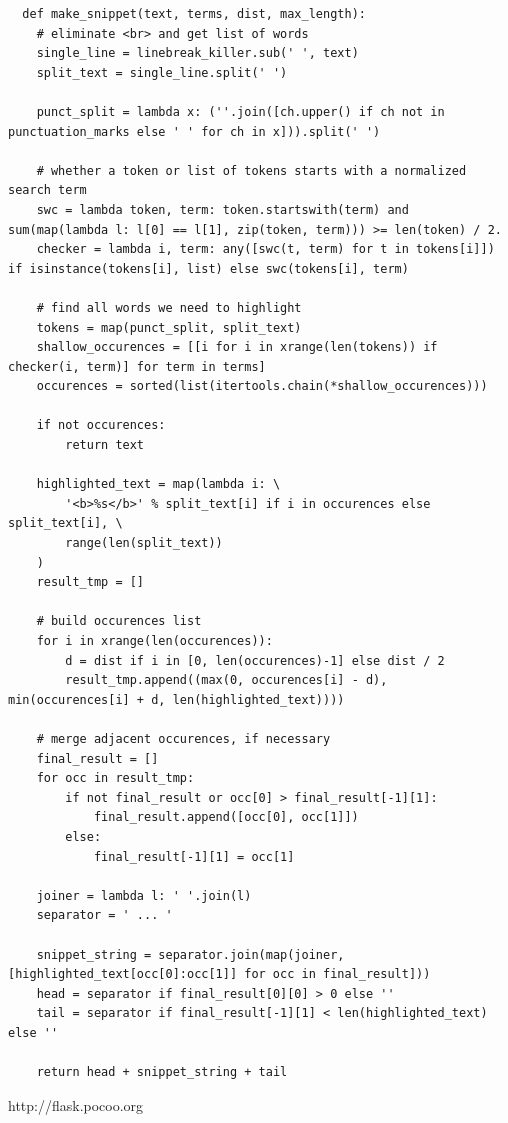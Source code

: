 \documentclass[14pt, a4paper]{extreport}
\begin{document}
\begin{lstlisting}
  def make_snippet(text, terms, dist, max_length):
    # eliminate <br> and get list of words
    single_line = linebreak_killer.sub(' ', text)
    split_text = single_line.split(' ')

    punct_split = lambda x: (''.join([ch.upper() if ch not in punctuation_marks else ' ' for ch in x])).split(' ')

    # whether a token or list of tokens starts with a normalized search term
    swc = lambda token, term: token.startswith(term) and sum(map(lambda l: l[0] == l[1], zip(token, term))) >= len(token) / 2.
    checker = lambda i, term: any([swc(t, term) for t in tokens[i]]) if isinstance(tokens[i], list) else swc(tokens[i], term)

    # find all words we need to highlight
    tokens = map(punct_split, split_text)
    shallow_occurences = [[i for i in xrange(len(tokens)) if checker(i, term)] for term in terms]
    occurences = sorted(list(itertools.chain(*shallow_occurences)))

    if not occurences:
        return text

    highlighted_text = map(lambda i: \
        '<b>%s</b>' % split_text[i] if i in occurences else split_text[i], \
        range(len(split_text))
    )
    result_tmp = []

    # build occurences list
    for i in xrange(len(occurences)):
        d = dist if i in [0, len(occurences)-1] else dist / 2
        result_tmp.append((max(0, occurences[i] - d), min(occurences[i] + d, len(highlighted_text))))

    # merge adjacent occurences, if necessary
    final_result = []
    for occ in result_tmp:
        if not final_result or occ[0] > final_result[-1][1]:
            final_result.append([occ[0], occ[1]])
        else:
            final_result[-1][1] = occ[1]

    joiner = lambda l: ' '.join(l)
    separator = ' ... '

    snippet_string = separator.join(map(joiner, [highlighted_text[occ[0]:occ[1]] for occ in final_result]))
    head = separator if final_result[0][0] > 0 else ''
    tail = separator if final_result[-1][1] < len(highlighted_text) else ''

    return head + snippet_string + tail
\end{lstlisting}

\newpage
\clearpage
%
\begin{thebibliography}{}
 http://flask.pocoo.org
\end{thebibliography}
\end{document}
